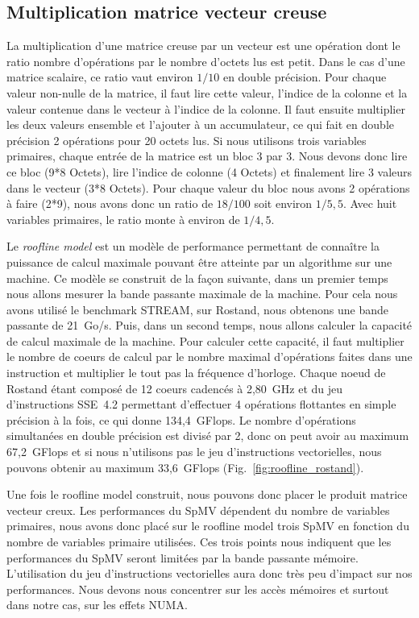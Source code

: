 \subsection{Multiplication matrice vecteur creuse}
La multiplication d'une matrice creuse par un vecteur est une opération dont le ratio nombre d'opérations par le nombre d'octets lus est petit.
%
Dans le cas d'une matrice scalaire, ce ratio vaut environ $1/10$ en double précision.
%
Pour chaque valeur non-nulle de la matrice, il faut lire cette valeur, l'indice de la colonne et la valeur contenue dans le vecteur à l'indice de la colonne.
%
Il faut ensuite multiplier les deux valeurs ensemble et l'ajouter à un accumulateur, ce qui fait en double précision 2 opérations pour 20 octets lus.
%
Si nous utilisons trois variables primaires, chaque entrée de la matrice est un bloc 3 par 3.
%
Nous devons donc lire ce bloc (9*8 Octets), lire l'indice de colonne (4 Octets) et finalement lire 3 valeurs dans le vecteur (3*8 Octets).
%
Pour chaque valeur du bloc nous avons 2 opérations à faire (2*9), nous avons donc un ratio de $18/100$ soit environ $1/5,5$.
%
Avec huit variables primaires, le ratio monte à environ de $1/4,5$.

Le {\em roofline model} est un modèle de performance permettant de connaître la puissance de calcul maximale pouvant être atteinte par un algorithme sur une machine.
%
Ce modèle se construit de la façon suivante, dans un premier temps nous allons mesurer la bande passante maximale de la machine.
%
Pour cela nous avons utilisé le benchmark STREAM, sur Rostand, nous obtenons une bande passante de 21~Go/s.
%
Puis, dans un second temps, nous allons calculer la capacité de calcul maximale de la machine.
%
Pour calculer cette capacité, il faut multiplier le nombre de coeurs de calcul par le nombre maximal d'opérations faites dans une instruction et multiplier le tout pas la fréquence d'horloge.
%
Chaque noeud de Rostand étant composé de 12 coeurs cadencés à 2,80~GHz et du jeu d'instructions SSE~4.2 permettant d'effectuer 4 opérations flottantes en simple précision à la fois, ce qui donne 134,4~GFlops.
%
Le nombre d'opérations simultanées en double précision est divisé par 2, donc on peut avoir au maximum 67,2~GFlops et si nous n'utilisons pas le jeu d'instructions vectorielles, nous pouvons obtenir au maximum 33,6~GFlops (Fig.~\ref{fig:roofline_rostand}).

Une fois le roofline model construit, nous pouvons donc placer le produit matrice vecteur creux.
%
Les performances du SpMV dépendent du nombre de variables primaires, nous avons donc placé sur le roofline model trois SpMV en fonction du nombre de variables primaire utilisées.
%
Ces trois points nous indiquent que les performances du SpMV seront limitées par la bande passante mémoire.
%
L'utilisation du jeu d'instructions vectorielles aura donc très peu d'impact sur nos performances.
%
Nous devons nous concentrer sur les accès mémoires et surtout dans notre cas, sur les effets NUMA.

